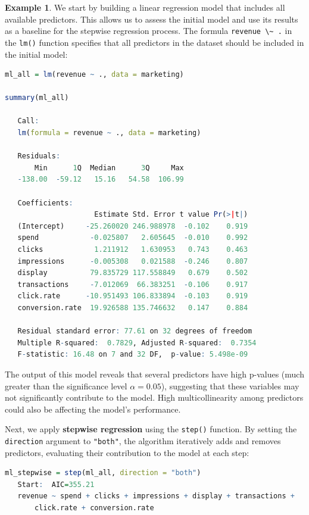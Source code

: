 \documentclass[
]{book}
\newcommand{\passthrough}[1]{#1}
\theoremstyle{definition}
\theoremstyle{definition}
\newtheorem{example}{Example}[chapter]
\theoremstyle{definition}
\theoremstyle{definition}
\theoremstyle{remark}
\begin{document}
\begin{example}
\protect\hypertarget{exm:ex-stepwise-regression}{}\label{exm:ex-stepwise-regression}We start by building a linear regression model that includes all available predictors. This allows us to assess the initial model and use its results as a baseline for the stepwise regression process. The formula \passthrough{\lstinline!revenue \~ .!} in the \passthrough{\lstinline!lm()!} function specifies that all predictors in the dataset should be included in the initial model:

\begin{lstlisting}[language=R]
ml_all = lm(revenue ~ ., data = marketing)

summary(ml_all)
   
   Call:
   lm(formula = revenue ~ ., data = marketing)
   
   Residuals:
       Min      1Q  Median      3Q     Max 
   -138.00  -59.12   15.16   54.58  106.99 
   
   Coefficients:
                     Estimate Std. Error t value Pr(>|t|)
   (Intercept)     -25.260020 246.988978  -0.102    0.919
   spend            -0.025807   2.605645  -0.010    0.992
   clicks            1.211912   1.630953   0.743    0.463
   impressions      -0.005308   0.021588  -0.246    0.807
   display          79.835729 117.558849   0.679    0.502
   transactions     -7.012069  66.383251  -0.106    0.917
   click.rate      -10.951493 106.833894  -0.103    0.919
   conversion.rate  19.926588 135.746632   0.147    0.884
   
   Residual standard error: 77.61 on 32 degrees of freedom
   Multiple R-squared:  0.7829, Adjusted R-squared:  0.7354 
   F-statistic: 16.48 on 7 and 32 DF,  p-value: 5.498e-09
\end{lstlisting}

The output of this model reveals that several predictors have high p-values (much greater than the significance level \(\alpha = 0.05\)), suggesting that these variables may not significantly contribute to the model. High multicollinearity among predictors could also be affecting the model's performance.

Next, we apply \textbf{stepwise regression} using the \passthrough{\lstinline!step()!} function. By setting the \passthrough{\lstinline!direction!} argument to \passthrough{\lstinline!"both"!}, the algorithm iteratively adds and removes predictors, evaluating their contribution to the model at each step:

\begin{lstlisting}[language=R]
ml_stepwise = step(ml_all, direction = "both")
   Start:  AIC=355.21
   revenue ~ spend + clicks + impressions + display + transactions + 
       click.rate + conversion.rate
   

\end{lstlisting}
\end{example}
\end{document}
